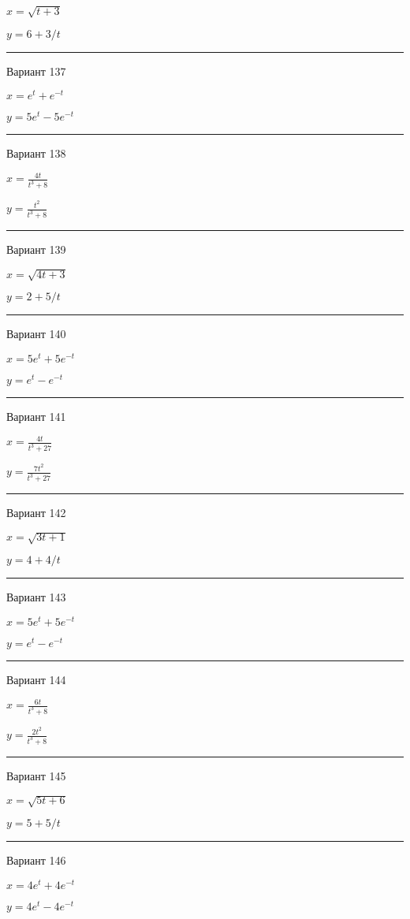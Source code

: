\documentclass[11pt]{report}
\begin{document}
$x = \sqrt{t + 3}$

$y = 6 + 3 / t$

\rule{\textwidth}{.2mm}

 Вариант 137

$x = e^{t} + e^{- t}$

$y = 5 e^{t} - 5 e^{- t}$

\rule{\textwidth}{.2mm}

 Вариант 138

$x = \frac{4 t}{t^{3} + 8}$

$y = \frac{t^{2}}{t^{3} + 8}$

\rule{\textwidth}{.2mm}

 Вариант 139

$x = \sqrt{4 t + 3}$

$y = 2 + 5 / t$

\rule{\textwidth}{.2mm}

 Вариант 140

$x = 5 e^{t} + 5 e^{- t}$

$y = e^{t} - e^{- t}$

\rule{\textwidth}{.2mm}

 Вариант 141

$x = \frac{4 t}{t^{3} + 27}$

$y = \frac{7 t^{2}}{t^{3} + 27}$

\rule{\textwidth}{.2mm}

 Вариант 142

$x = \sqrt{3 t + 1}$

$y = 4 + 4 / t$

\rule{\textwidth}{.2mm}

 Вариант 143

$x = 5 e^{t} + 5 e^{- t}$

$y = e^{t} - e^{- t}$

\rule{\textwidth}{.2mm}

 Вариант 144

$x = \frac{6 t}{t^{3} + 8}$

$y = \frac{2 t^{2}}{t^{3} + 8}$

\rule{\textwidth}{.2mm}

 Вариант 145

$x = \sqrt{5 t + 6}$

$y = 5 + 5 / t$

\rule{\textwidth}{.2mm}

 Вариант 146

$x = 4 e^{t} + 4 e^{- t}$

$y = 4 e^{t} - 4 e^{- t}$
\end{document}
